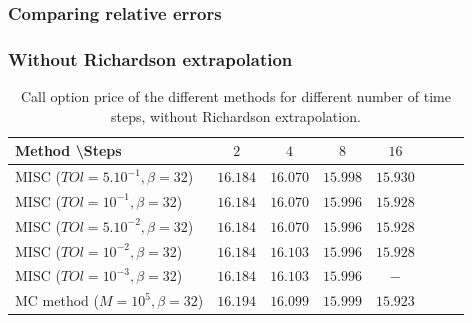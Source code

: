 \documentclass[11pt]{article}
\newcommand{\expt}[1]{\mathrm{E}\left[#1\right]}
\begin{document}
%	

\FloatBarrier
\subsubsection{Comparing relative errors}
\subsubsection*{Without Richardson extrapolation}

\begin{table}[h!]
	\centering
	\begin{tabular}{l*{6}{c}r}
		Method \textbackslash  Steps            & $2$ & $4$ & $8$ & $16$ &   \\
		\hline
		MISC ($TOl=5.10^{-1},\beta=32$)  & $16.184$ & $16.070$ & $15.998$ & $15.930$  \\
		MISC ($TOl=10^{-1},\beta=32$)  & $16.184$ & $16.070$ & $15.996$ &$15.928$  \\
		MISC ($TOl=5.10^{-2},\beta=32$) & $16.184$ & $16.070$ & $15.996$ & $15.928$  \\
		MISC ($TOl=10^{-2},\beta=32$) & $16.184$ & $16.103$ & $15.996$ &$15.928$  \\
		MISC ($TOl=10^{-3},\beta=32$) & $16.184$ & $16.103$ & $15.996$ & $-$  \\
		
		\hline
		MC method ($M=10^{5}, \beta=32$)   & $  16.194$ & $ 16.099$ & $
		15.999$ & $  15.923$  \\
		\hline
	\end{tabular}
	\caption{Call option price of the different methods for different number of time steps, without Richardson extrapolation.}
	\label{table:Call option price of the different methods for different number of time steps, without Richardson extrapolation.}
\end{table}
\end{document}
